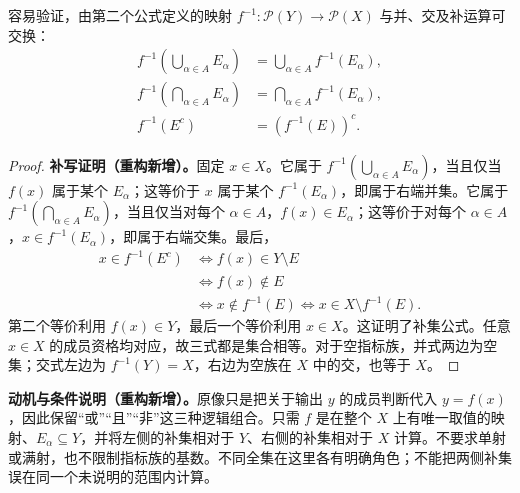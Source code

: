 \documentclass[../../main.tex]{subfiles}%
\begin{document}
\begin{proposition}\label{proposition:ch00-inverse-image-operations}
容易验证，由第二个公式定义的映射 $f^{-1}:\mathscr{P}(Y)\to\mathscr{P}(X)$ 与并、交及补运算可交换：
\begin{align*}
f^{-1}\left(\bigcup_{\alpha\in A}E_\alpha\right)&=\bigcup_{\alpha\in A}f^{-1}(E_\alpha),\\
f^{-1}\left(\bigcap_{\alpha\in A}E_\alpha\right)&=\bigcap_{\alpha\in A}f^{-1}(E_\alpha),\\
f^{-1}(E^c)&=(f^{-1}(E))^c.
\end{align*}
\end{proposition}
\begin{proof}
\textbf{补写证明（重构新增）。}固定 $x\in X$。它属于 $f^{-1}(\bigcup_{\alpha\in A}E_\alpha)$，当且仅当 $f(x)$ 属于某个 $E_\alpha$；这等价于 $x$ 属于某个 $f^{-1}(E_\alpha)$，即属于右端并集。它属于 $f^{-1}(\bigcap_{\alpha\in A}E_\alpha)$，当且仅当对每个 $\alpha\in A$，$f(x)\in E_\alpha$；这等价于对每个 $\alpha\in A$，$x\in f^{-1}(E_\alpha)$，即属于右端交集。最后，
\begin{align*}
x\in f^{-1}(E^c)
&\Longleftrightarrow f(x)\in Y\setminus E\\
&\Longleftrightarrow f(x)\notin E\\
&\Longleftrightarrow x\notin f^{-1}(E)
\Longleftrightarrow x\in X\setminus f^{-1}(E).
\end{align*}
第二个等价利用 $f(x)\in Y$，最后一个等价利用 $x\in X$。这证明了补集公式。任意 $x\in X$ 的成员资格均对应，故三式都是集合相等。对于空指标族，并式两边为空集；交式左边为 $f^{-1}(Y)=X$，右边为空族在 $X$ 中的交，也等于 $X$。
\end{proof}
\begin{remark}
\textbf{动机与条件说明（重构新增）。}原像只是把关于输出 $y$ 的成员判断代入 $y=f(x)$，因此保留“或”“且”“非”这三种逻辑组合。只需 $f$ 是在整个 $X$ 上有唯一取值的映射、$E_\alpha\subseteq Y$，并将左侧的补集相对于 $Y$、右侧的补集相对于 $X$ 计算。不要求单射或满射，也不限制指标族的基数。不同全集在这里各有明确角色；不能把两侧补集误在同一个未说明的范围内计算。
\end{remark}
\end{document}
